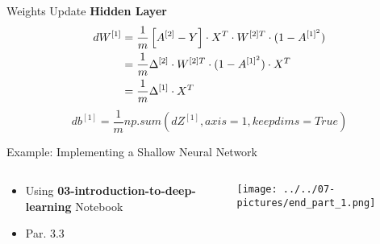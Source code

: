 \documentclass[11pt]{beamer}
\begin{document}
\begin{frame}{Weights Update}
\textbf{Hidden Layer}
\begin{align}
dW^{[1]} &= \frac{1}{m} \left[ A^{[2]} - Y \right] \cdot  X^{T} \cdot W^{[2]T} \cdot (1 - A^{[1]^2}) \notag\\
         &= \frac{1}{m} \Delta^{[2]} \cdot W^{[2]T} \cdot (1 - A^{[1]^2}) \cdot  X^{T}   \notag\\
         &= \frac{1}{m} \Delta^{[1]} \cdot  X^{T} 
\end{align}
\begin{equation} 
db^{[1]} = \frac{1}{m}np.sum(dZ^{[1]}, axis=1, keepdims=True)  
\end{equation}
\end{frame}
\begin{frame}{Example: Implementing a Shallow Neural Network}
\begin{columns}[T] %
\begin{column}{.48\textwidth}
        \begin{itemize}
		\item Using \textbf{03-introduction-to-deep-learning} Notebook 
		\item Par. 3.3
        \end{itemize}
\end{column}%
\hfill%
\begin{column}{.48\textwidth}
        \texttt{[image: ../../07-pictures/end\_part\_1.png]}
\end{column}%
\end{columns}
\end{frame}
\end{document}
